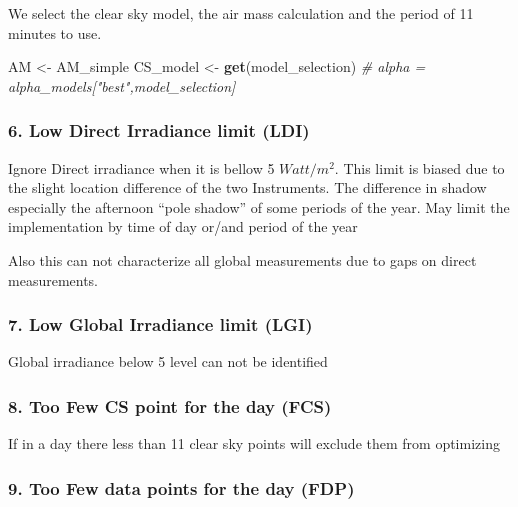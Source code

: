 \documentclass[
  10pt,
  a4paper,oneside]{article}
\newenvironment{Shaded}{\begin{snugshade}}{\end{snugshade}}
\newcommand{\CommentTok}[1]{\textcolor[rgb]{0.56,0.35,0.01}{\textit{#1}}}
\newcommand{\KeywordTok}[1]{\textcolor[rgb]{0.13,0.29,0.53}{\textbf{#1}}}
\newcommand{\NormalTok}[1]{#1}
\newcommand{\StringTok}[1]{\textcolor[rgb]{0.31,0.60,0.02}{#1}}
\begin{document}
We select the clear sky model, the air mass calculation
and the period of 11
minutes to use.

\begin{Shaded}
\begin{Highlighting}[]
\NormalTok{AM       \textless{}{-}}\StringTok{ }\NormalTok{AM\_simple}
\NormalTok{CS\_model \textless{}{-}}\StringTok{ }\KeywordTok{get}\NormalTok{(model\_selection)}
\CommentTok{\# alpha    = alpha\_models["best",model\_selection]}
\end{Highlighting}
\end{Shaded}

\hypertarget{low-direct-irradiance-limit-ldi}{%
\subsubsection{6. Low Direct Irradiance limit (LDI)}\label{low-direct-irradiance-limit-ldi}}

Ignore Direct irradiance when it is bellow 5 \(Watt/m^2\).
This limit is biased due to the slight location difference of the two Instruments.
The difference in shadow especially the afternoon ``pole shadow'' of some periods of the year.
May limit the implementation by time of day or/and period of the year

Also this can not characterize all global measurements due to gaps on direct measurements.

\hypertarget{low-global-irradiance-limit-lgi}{%
\subsubsection{7. Low Global Irradiance limit (LGI)}\label{low-global-irradiance-limit-lgi}}

Global irradiance below 5 level can not be identified

\hypertarget{too-few-cs-point-for-the-day-fcs}{%
\subsubsection{8. Too Few CS point for the day (FCS)}\label{too-few-cs-point-for-the-day-fcs}}

If in a day there less than 11 clear sky points will exclude them from optimizing

\hypertarget{too-few-data-points-for-the-day-fdp}{%
\subsubsection{9. Too Few data points for the day (FDP)}\label{too-few-data-points-for-the-day-fdp}}
\end{document}
